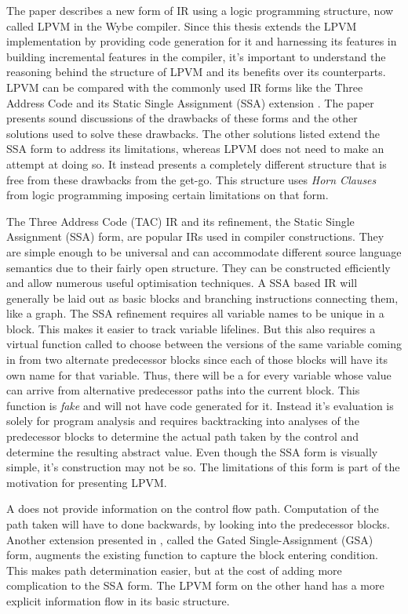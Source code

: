 The paper describes a new form of IR using a logic programming structure, now
called LPVM in the Wybe compiler. Since this thesis extends the LPVM
implementation by providing code generation for it and harnessing its features
in building incremental features in the compiler, it's important to understand
the reasoning behind the structure of LPVM and its benefits over its
counterparts. LPVM can be compared with the commonly used IR forms like the
Three Address Code and its Static Single Assignment (SSA) extension
\citep{alpernSSA}. The paper presents sound discussions of the drawbacks of
these forms and the other solutions used to solve these drawbacks. The other
solutions listed extend the SSA form to address its limitations, whereas LPVM
does not need to make an attempt at doing so. It instead presents a completely
different structure that is free from these drawbacks from the get-go. This
structure uses \textit{Horn Clauses} from logic programming imposing certain limitations
on that form.

The Three Address Code (TAC) IR and its refinement, the Static Single
Assignment (SSA) form, are popular IRs used in compiler constructions. They are
simple enough to be universal and can accommodate different source language
semantics due to their fairly open structure. They can be constructed
efficiently \citep{cytronSSA} and allow numerous useful optimisation
techniques. A SSA based IR will generally be laid out as basic blocks and
branching instructions connecting them, like a graph. The SSA refinement
requires all variable names to be unique in a block. This makes it easier to
track variable lifelines. But this also requires a virtual function called
\phif to choose between the versions of the same variable coming in from two
alternate predecessor blocks since each of those blocks will have its own name
for that variable. Thus, there will be a \phif for every variable whose value
can arrive from alternative predecessor paths into the current block. This
function is \textit{fake} and will not have code generated for it. Instead it's
evaluation is solely for program analysis and requires backtracking into
analyses of the predecessor blocks to determine the actual path taken by the
control and determine the resulting abstract value. Even though the SSA form is
visually simple, it's construction may not be so. The limitations of this form
is part of the motivation for presenting LPVM.

A \phif does not provide information on the control flow path. Computation of
the path taken will have to done backwards, by looking into the predecessor
blocks. Another extension presented in \cite{gsa}, called the Gated Single-Assignment
(GSA) form, augments the existing \phif function to capture the block
entering condition. This makes path determination easier, but at the cost of
adding more complication to the SSA form. The LPVM form on the other hand has a
more explicit information flow in its basic structure.

